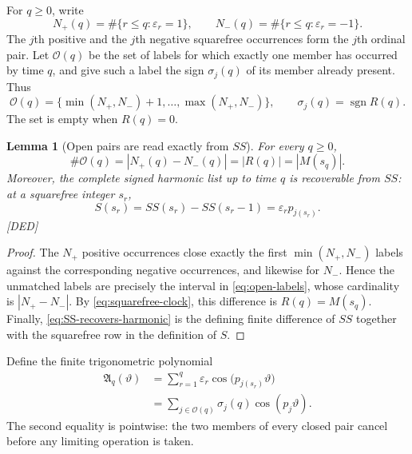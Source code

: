 \documentclass[11pt]{amsart}
\numberwithin{equation}{section}
\theoremstyle{plain}
\newtheorem{lemma}[theorem]{Lemma}
\theoremstyle{definition}
\theoremstyle{remark}
\newcommand{\sgn}{\operatorname{sgn}}
\begin{document}
For $q\geq0$, write
\begin{equation}
 N_+(q)=\#\{r\leq q:\varepsilon_r=1\},\qquad
 N_-(q)=\#\{r\leq q:\varepsilon_r=-1\}.
\label{eq:sign-counters-zero-mode}
\end{equation}
The $j$th positive and the $j$th negative squarefree occurrences form the
$j$th ordinal pair.  Let $\mathcal O(q)$ be the set of labels for which
exactly one member has occurred by time $q$, and give such a label the sign
$\sigma_j(q)$ of its member already present.  Thus
\begin{equation}
 \mathcal O(q)=
 \{\min(N_+,N_-)+1,\ldots,\max(N_+,N_-)\},
 \qquad \sigma_j(q)=\sgn R(q).
\label{eq:open-labels}
\end{equation}
The set is empty when $R(q)=0$.

\begin{lemma}[Open pairs are read exactly from $SS$]
\label{lem:SS-open-pairs-zero-mode}
For every $q\geq0$,
\begin{equation}
 \#\mathcal O(q)=|N_+(q)-N_-(q)|=|R(q)|=|M(s_q)|.
\label{eq:open-count-Mertens}
\end{equation}
Moreover, the complete signed harmonic list up to time $q$ is recoverable
from $SS$: at a squarefree integer $s_r$,
\begin{equation}
 S(s_r)=SS(s_r)-SS(s_r-1)
       =\varepsilon_r p_{j(s_r)}.
\label{eq:SS-recovers-harmonic}
\end{equation}
\textup{[DED]}
\end{lemma}

\begin{proof}
The $N_+$ positive occurrences close exactly the first
$\min(N_+,N_-)$ labels against the corresponding negative occurrences, and
likewise for $N_-$.  Hence the unmatched labels are precisely the interval
in \eqref{eq:open-labels}, whose cardinality is $|N_+-N_-|$.  By
\eqref{eq:squarefree-clock}, this difference is $R(q)=M(s_q)$.  Finally,
\eqref{eq:SS-recovers-harmonic} is the defining finite difference of $SS$
together with the squarefree row in the definition of $S$.
\end{proof}

Define the finite trigonometric polynomial
\begin{align}
 \mathfrak A_q(\vartheta)
   &=\sum_{r=1}^{q}\varepsilon_r
        \cos\bigl(p_{j(s_r)}\vartheta\bigr)
\label{eq:Aq-event-definition}\\
   &=\sum_{j\in\mathcal O(q)}\sigma_j(q)\cos(p_j\vartheta).
\label{eq:Aq-open-definition}
\end{align}
The second equality is pointwise: the two members of every closed pair
cancel before any limiting operation is taken.
\end{document}

